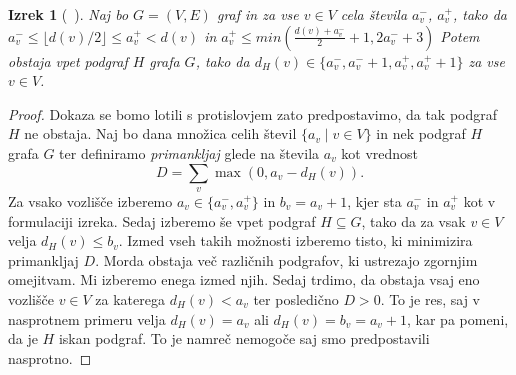 \documentclass[12pt,a4paper,twoside]{article}
\theoremstyle{definition} %
\theoremstyle{plain} %
\newtheorem{izrek}[definicija]{Izrek}
\numberwithin{equation}{section}  %
\begin{document}
\begin{izrek}[~\citet{random12}]
\label{factor}
Naj bo $G = (V, E)$ graf in za vse $v \in V$ cela števila $a_v^-$, $a_v^+$, tako da $a_v^- \le \lfloor d(v)/2 \rfloor \le a_v^+ < d(v)$ in $a_v^+ \le min \left( \frac{d(v) + a_v^-}{2} + 1, 2a_v^- + 3 \right)$ Potem obstaja vpet podgraf $H$ grafa $G$, tako da $d_H(v) \in \{ a_v^-, a_v^- + 1, a_v^+, a_v^+ + 1\}$ za vse $v \in V$.
\end{izrek}

\begin{proof}
Dokaza se bomo lotili s protislovjem zato predpostavimo, da tak podgraf $H$ ne obstaja. Naj bo dana množica celih števil $\{ a_v  \mid v \in V\}$ in nek podgraf $H$ grafa $G$ ter definiramo \textit{primankljaj} glede na števila $a_v$ kot vrednost
$$D = \sum_v \max(0, a_v - d_H(v)) .$$ 
Za vsako vozlišče izberemo $a_v \in \{a_v^-, a_v^+\}$ in $b_v = a_v +1$, kjer sta $a_v^-$ in $a_v^+$ kot v formulaciji izreka. Sedaj izberemo še vpet podgraf $H \subseteq G$, tako da za vsak $v \in V$ velja $d_H(v) \le b_v$. Izmed vseh takih možnosti izberemo tisto, ki minimizira primankljaj $D$. Morda obstaja več različnih podgrafov, ki ustrezajo zgornjim omejitvam. Mi izberemo enega izmed njih.  Sedaj trdimo, da obstaja vsaj eno vozlišče $v \in V$ za katerega $d_H(v) < a_v$ ter posledično $D > 0$. To je res, saj v nasprotnem primeru  velja $d_H(v) = a_v$ ali $d_H(v) = b_v = a_v + 1$, kar pa pomeni, da je $H$ iskan podgraf. To je namreč nemogoče saj smo predpostavili nasprotno.


\end{proof}
\end{document}
